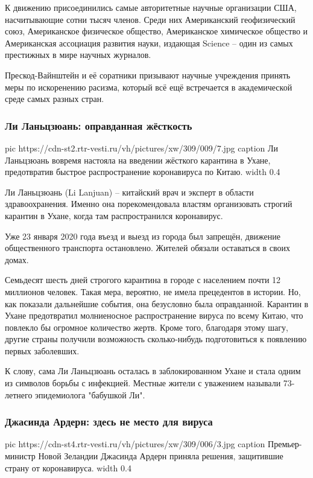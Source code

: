 К движению присоединились самые авторитетные научные организации США,
насчитывающие сотни тысяч членов. Среди них Американский геофизический союз,
Американское физическое общество, Американское химическое общество и
Американская ассоциация развития науки, издающая Science – один из самых
престижных в мире научных журналов.

Прескод-Вайнштейн и её соратники призывают научные учреждения принять меры по
искоренению расизма, который всё ещё встречается в академической среде самых
разных стран.

\subsubsection{Ли Ланьцзюань: оправданная жёсткость}

\ifcmt
  pic https://cdn-st2.rtr-vesti.ru/vh/pictures/xw/309/009/7.jpg
	caption Ли Ланьцзюань вовремя настояла на введении жёсткого карантина в Ухане, предотвратив быстрое распространение коронавируса по Китаю.
  width 0.4
\fi

Ли Ланьцзюань (Li Lanjuan) – китайский врач и эксперт в области
здравоохранения. Именно она порекомендовала властям организовать строгий
карантин в Ухане, когда там распространился коронавирус.

Уже 23 января 2020 года въезд и выезд из города был запрещён, движение
общественного транспорта остановлено. Жителей обязали оставаться в своих домах.

Семьдесят шесть дней строгого карантина в городе с населением почти 12
миллионов человек. Такая мера, вероятно, не имела прецедентов в истории. Но,
как показали дальнейшие события, она безусловно была оправданной. Карантин в
Ухане предотвратил молниеносное распространение вируса по всему Китаю, что
повлекло бы огромное количество жертв. Кроме того, благодаря этому шагу, другие
страны получили возможность сколько-нибудь подготовиться к появлению первых
заболевших.

К слову, сама Ли Ланьцзюань осталась в заблокированном Ухане и стала одним из
символов борьбы с инфекцией. Местные жители с уважением называли 73-летнего
эпидемиолога "бабушкой Ли".

\subsubsection{Джасинда Ардерн: здесь не место для вируса}


\ifcmt
  pic https://cdn-st4.rtr-vesti.ru/vh/pictures/xw/309/006/3.jpg
	caption Премьер-министр Новой Зеландии Джасинда Ардерн приняла решения, защитившие страну от коронавируса.
  width 0.4
\fi

